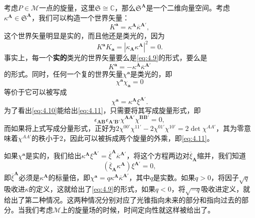 考虑$P\in \mathcal{M}$一点的旋量，这里$\mathfrak{S} \cong \mathbb{C}$，那么$\mathfrak{S}^{\boldsymbol{A}}$是一个二维向量空间。考虑$\kappa ^{\boldsymbol{A}} \in \mathfrak{S}^{\boldsymbol{A}}$，我们可以构造一个世界矢量：
\begin{equation}
	K^{\boldsymbol{a}} =\kappa ^{\boldsymbol{A}}\overline{\kappa }^{\boldsymbol{A} '} ,
	\label{eq:4.9}
\end{equation}
这个世界矢量明显是实的，而且他还是类光的，因为
\begin{equation*}
	K^{\boldsymbol{a}} K_{\boldsymbol{a}} =\left| \kappa _{\boldsymbol{A}} \kappa ^{\boldsymbol{A}}\right| ^{2} =0.
\end{equation*}
事实上，每一个\textbf{实的}类光的世界矢量要么是\ref{eq:4.9}的形式，要么是
\begin{equation*}
	K^{\boldsymbol{a}} =-\kappa ^{\boldsymbol{A}}\overline{\kappa }^{\boldsymbol{A} '}
\end{equation*}
的形式。同时，任何一个复的世界矢量$\chi ^{\boldsymbol{a}}$是类光的，即
\begin{equation}
	\chi ^{\boldsymbol{a}} \chi _{\boldsymbol{a}} =0
	\label{eq:4.10}
\end{equation}
等价于它可以被写成
\begin{equation}
	\chi ^{\boldsymbol{a}} =\kappa ^{\boldsymbol{A}} \xi ^{\boldsymbol{A} '} .
	\label{eq:4.11}
\end{equation}
为了看出\ref{eq:4.10}能给出\ref{eq:4.11}，只需要将其写成旋量形式，即
\begin{equation*}
	\epsilon _{\boldsymbol{AB}} \epsilon _{\boldsymbol{A} '\boldsymbol{B} '} \chi ^{\boldsymbol{AA} '} \chi ^{\boldsymbol{BB} '} =0,
\end{equation*}
而如果将上式写成分量形式，正好为$2\chi ^{00'} \chi ^{11'} -2\chi ^{01'} \chi ^{10'} =2\det \chi ^{AA'}$，其为零意味着$\chi ^{AA'}$的秩小于$2$，因此可以被拆成两个旋量的外乘，即\ref{eq:4.11}。

如果$\chi ^{\boldsymbol{a}}$是实的，我们给出$\kappa ^{\boldsymbol{A}} \xi ^{\boldsymbol{A} '} =\overline{\xi }^{\boldsymbol{A}}\overline{\kappa }^{\boldsymbol{A} '}$，将这个方程两边对$\overline{\xi }_{\boldsymbol{A}}$缩并，我们知道
\begin{equation*}
	(\overline{\xi }_{\boldsymbol{A}} \kappa ^{\boldsymbol{A}} )\xi ^{\boldsymbol{A} '} =0,
\end{equation*}
即$\overline{\xi }^{\boldsymbol{A}}$必须是$\kappa ^{\boldsymbol{A}}$的标量倍，即$\chi ^{\boldsymbol{a}} =q\kappa ^{\boldsymbol{A}}\overline{\kappa }^{\boldsymbol{A} '}$，其中$q$是实数。如果$q >0$，将因子$\sqrt{q}$吸收进$\kappa $的定义，这就给出了\ref{eq:4.9}的形式，如果$q< 0$，将$\sqrt{-q}$吸收进定义，就给出了第二种情况。这两种情况分别对应了光锥指向未来的部分和指向过去的部分。当我们考虑$\mathcal{M}$上的旋量场的时候，时间定向性就这样被给出了。



